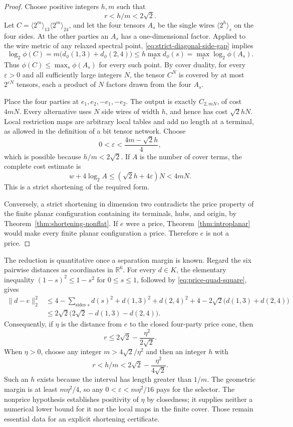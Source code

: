\begin{proof}
Choose positive integers $h,m$ such that
\[
 r<h/m<2\sqrt2.
\]
Let $C=\langle2^m\rangle_{13}\langle2^m\rangle_{24}$, and let the four tensors $A_s$ be the single wires $\langle2^h\rangle_s$ on the four sides. At the other parties an $A_s$ has a one-dimensional factor. Applied to the wire metric of any relaxed spectral point, \eqref{eq:strict-diagonal-side-gap} implies
\[
 \log_2\phi(C)=m\bigl(d_\phi(1,3)+d_\phi(2,4)\bigr)
 \leq h\max_s d_\phi(s)=\max_s\log_2\phi(A_s).
\]
Thus $\phi(C)\leq\max_s\phi(A_s)$ for every such point. By cover duality, for every $\varepsilon>0$ and all sufficiently large integers $N$, the tensor $C^N$ is covered by at most $2^{\varepsilon N}$ tensors, each a product of $N$ factors drawn from the four $A_s$.

Place the four parties at $e_1,e_2,-e_1,-e_2$. The output is exactly $C_{2,mN}$, of cost $4mN$. Every alternative uses $N$ side wires of width $h$, and hence has cost $\sqrt2hN$. Local restriction maps are arbitrary local tables and add no length at a terminal, as allowed in the definition of a bit tensor network. Choose
\[
 0<\varepsilon<\frac{4m-\sqrt2h}{4},
\]
which is possible because $h/m<2\sqrt2$. If $A$ is the number of cover terms, the complete cost estimate is
\[
 w+4\log_2 A\leq
 (\sqrt2h+4\varepsilon)N<4mN.
\]
This is a strict shortening of the required form.

Conversely, a strict shortening in dimension two contradicts the price property of the finite planar configuration containing its terminals, hubs, and origin, by Theorem~\ref{thm:shortening-nonflat}. If $e$ were a price, Theorem~\ref{thm:introplanar} would make every finite planar configuration a price. Therefore $e$ is not a price.
\end{proof}

The reduction is quantitative once a separation margin is known. Regard the six pairwise distances as coordinates in $\mathbb R^6$. For every $d\in K$, the elementary inequality $(1-s)^2\leq1-s^2$ for $0\leq s\leq1$, followed by \eqref{eq:price-quad-square}, gives
\begin{align*}
 \|d-e\|_2^2
 &\leq4-\sum_{\text{sides }s}d(s)^2
      +d(1,3)^2+d(2,4)^2+4
      -2\sqrt2\bigl(d(1,3)+d(2,4)\bigr)\\
 &\leq2\sqrt2\bigl(2\sqrt2-d(1,3)-d(2,4)\bigr).
\end{align*}
Consequently, if $\eta$ is the distance from $e$ to the closed four-party price cone, then
\[
 r\leq2\sqrt2-\frac{\eta^2}{2\sqrt2}.
\]
When $\eta>0$, choose any integer $m>4\sqrt2/\eta^2$ and then an integer $h$ with
\[
 r<h/m<2\sqrt2-\frac{\eta^2}{4\sqrt2}.
\]
Such an $h$ exists because the interval has length greater than $1/m$. The geometric margin is at least $m\eta^2/4$, so any $0<\varepsilon<m\eta^2/16$ pays for the selector. The nonprice hypothesis establishes positivity of $\eta$ by closedness; it supplies neither a numerical lower bound for it nor the local maps in the finite cover. Those remain essential data for an explicit shortening certificate.

